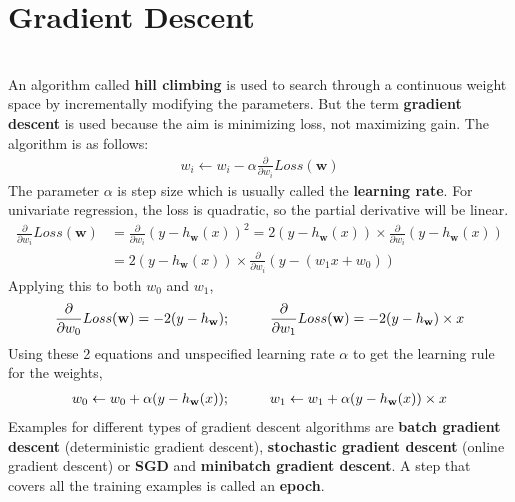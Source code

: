 \documentclass{article}
\begin{document}
\section{Gradient Descent}
\begin{paragraph}
\\
An algorithm called \textbf{hill climbing} is used to search through a continuous weight space by incrementally modifying the parameters. But the term \textbf{gradient descent} is used because the aim is minimizing loss, not maximizing gain. The algorithm is as follows:
\begin{align*}
w_i \leftarrow w_i - \alpha \frac{\partial}{\partial w_i}Loss(\textbf{w})
\end{align*}
The parameter $\alpha$ is step size which is usually called the \textbf{learning rate}. For univariate regression, the loss is quadratic, so the partial derivative will be linear. 
\begin{align*}
\frac{\partial}{\partial w_i}Loss(\textbf{w}) & = \frac{\partial}{\partial w_i}(y - h_\textbf{w}(x))^2 = 2(y - h_\textbf{w}(x)) \times \frac{\partial}{\partial w_i}(y - h_\textbf{w}(x)) \\
& = 2(y - h_\textbf{w}(x)) \times \frac{\partial}{\partial w_i}(y - (w_1x + w_0))
\end{align*}
Applying this to both $w_0$ and $w_1$,
\begin{align*}
\frac{\partial}{\partial w_0}Loss(\textbf{w}) = -2(y - h_\textbf{w});\hspace{1 cm}\frac{\partial}{\partial w_1}Loss(\textbf{w}) = -2(y - h_\textbf{w}) \times x
\end{align*}
Using these 2 equations and unspecified learning rate $\alpha$ to get the learning rule for the weights,
\begin{align*}
w_0 \leftarrow w_0 + \alpha (y - h_\textbf{w}(x));\hspace{1 cm} w_1 \leftarrow w_1 + \alpha (y - h_\textbf{w}(x)) \times x
\end{align*}
Examples for different types of gradient descent algorithms are \textbf{batch gradient descent} (deterministic gradient descent), \textbf{stochastic gradient descent} (online gradient descent) or \textbf{SGD} and \textbf{minibatch gradient descent}. A step that covers all the training examples is called an \textbf{epoch}. 
\end{paragraph}
\end{document}
